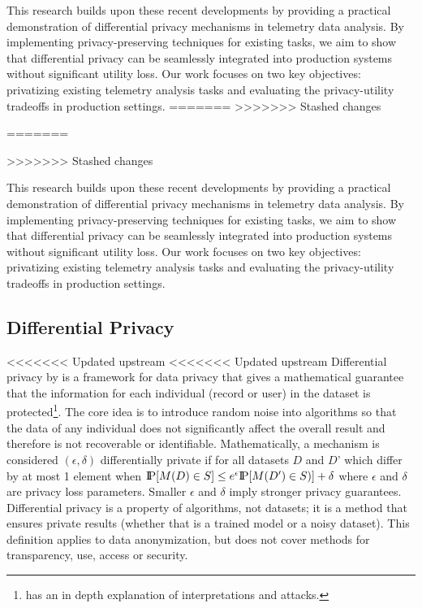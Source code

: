 \documentclass[12pt,letterpaper]{article}
\begin{document}
This research builds upon these recent developments by providing a practical demonstration of differential privacy mechanisms in telemetry data analysis. By implementing privacy-preserving techniques for existing tasks, we aim to show that differential privacy can be seamlessly integrated into production systems without significant utility loss. Our work focuses on two key objectives: privatizing existing telemetry analysis tasks and evaluating the privacy-utility tradeoffs in production settings.
=======
>>>>>>> Stashed changes

=======

>>>>>>> Stashed changes

This research builds upon these recent developments by providing a practical demonstration of differential privacy mechanisms in telemetry data analysis. By implementing privacy-preserving techniques for existing tasks, we aim to show that differential privacy can be seamlessly integrated into production systems without significant utility loss. Our work focuses on two key objectives: privatizing existing telemetry analysis tasks and evaluating the privacy-utility tradeoffs in production settings.

\subsection{Differential Privacy}

<<<<<<< Updated upstream
<<<<<<< Updated upstream
Differential privacy by \cite{DworkRoth} is a framework for data privacy that gives a mathematical guarantee that the information for each individual (record or user) in the dataset is protected\footnote{\cite{DP-def} has an in depth explanation of interpretations and attacks.}. The core idea is to introduce random noise into algorithms so that the data of any individual does not significantly affect the overall result and therefore is not recoverable or identifiable. Mathematically, a mechanism is considered $(\epsilon, \delta)$ differentially private if for all datasets $D$ and $D’$ which differ by at most 1 element when $\P [ M(D)\in S ] \leq e^\epsilon \P [ M(D') \in S)] + \delta$ where $\epsilon$ and $\delta$ are privacy loss parameters. Smaller $\epsilon$ and $\delta$ imply stronger privacy guarantees. Differential privacy is a property of algorithms, not datasets; it is a method that ensures private results (whether that is a trained model or a noisy dataset). This definition applies to data anonymization, but does not cover methods for transparency, use, access or security.
\end{document}
